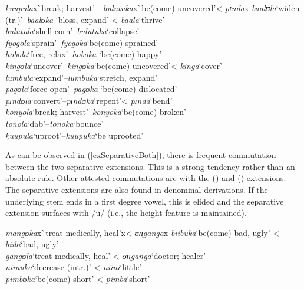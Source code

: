 \newpage 
\begin{exe}
\ex\label{exSeparativeBoth}
\begin{tabbing}
\textit{kuupula}x\=`break; harvest'\=-- \=\textit{bulutuka}x\=`be(come) uncovered'\=< \textit{pɪnda}x\=\kill%
\textit{baalʊla}\>`widen (tr.)'\>--\>\textit{baalʊka}\> \lq bloss, expand'\> < \textit{baala}\>`thrive'\\
\textit{bulutula}\>`shell corn'\>--\>\textit{bulutuka}\>`collapse'\\
\textit{fyogola}\>`sprain'\>--\>\textit{fyogoka}\>`be(come) sprained'\\
\textit{hobola}\>`free, relax'\>--\>\textit{hoboka}\> \lq be(come) happy'\\
\textit{kingʊla}\>`uncover'\>--\>\textit{kingʊka}\>`be(come) uncovered'\>< \textit{kinga}\>`cover'\\
\textit{lumbula}\>`expand'\>--\>\textit{lumbuka}\>`stretch, expand'\\  
\textit{pagʊla}\>`force open'\>--\>\textit{pagʊka}\> \lq be(come) dislocated'\\
\textit{pɪndʊla}\>`convert'\>--\>\textit{pɪndʊka}\>\lq repent'\>< \textit{pɪnda}\>\lq bend'\\
\textit{konyola}\>`break; harvest'\>--\>\textit{konyoka}\>`be(come) broken'\\
\textit{tonola}\>\lq dab'\>--\>\textit{tonoka}\>`bounce'\\ %
\textit{kuupula}\>`uproot'\>--\>\textit{kuupuka}\>`be uprooted'
\end{tabbing}
\end{exe} %

As can be observed in (\ref{exSeparativeBoth}), there is frequent commutation between the two separative extensions. This is a strong tendency rather than an absolute rule. Other attested commutations are with the  () and  () extensions.
The separative extensions are also found in denominal derivations. If the underlying stem ends in a first degree vowel, this is elided and the separative extension surfaces with /u/ (i.e., the height feature is maintained).
\begin{exe}
\ex
\begin{tabbing}
\textit{mangʊka}x\=`treat medically, heal'x\=< \textit{ʊn̩ganga}x\=\kill%
\textit{biibuka}\>`be(come) bad, ugly'\> < \textit{biibi}\>`bad, ugly'
\\\textit{gangʊla}\>`treat medically, heal'\> < \textit{ʊn̩ganga}\>`doctor; healer'
\\\textit{niinuka}\>`decrease (intr.)'\> < \textit{niini}\>`little'
\\\textit{pimbʊka}\>`be(come) short'\> <	\textit{pimba}\>`short'
\end{tabbing}
\end{exe}


